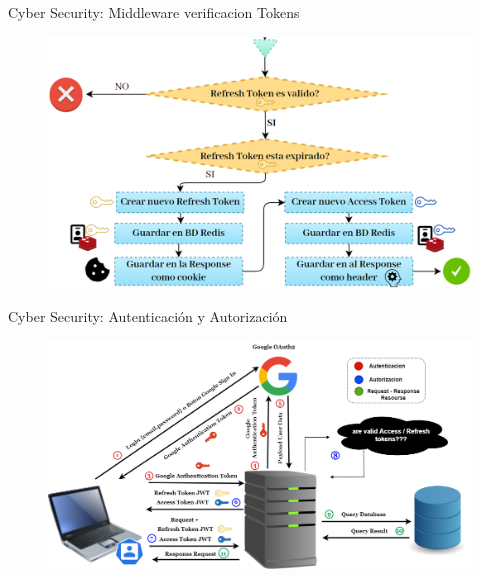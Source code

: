\documentclass[xcolor=pdftex,dvipsnames,table]{beamer}
\begin{document}
\begin{frame}{Cyber Security: Middleware verificacion Tokens }
        \begin{figure}
            \centering
            \includegraphics[width=0.9\linewidth]{cyber/5diagrama3.PNG}
            \label{fig:my_label}
        \end{figure}
\end{frame}
\begin{frame}{Cyber Security:  Autenticación y Autorización  }
        \begin{figure}
            \centering
            \includegraphics[width=1\linewidth]{cyber/6SEGURITYFINALGOOGLE .png}
            \label{fig:my_label}
        \end{figure}
\end{frame}
\end{document}
